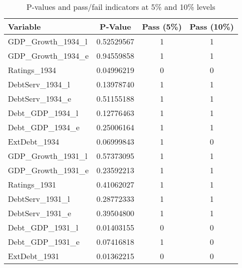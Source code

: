 \begin{table}[ht!]
\centering
\begin{tabular}{lccc}
\toprule
Variable & P‐Value & Pass (5\%) & Pass (10\%) \\
\midrule
GDP\_Growth\_1934\_l   & 0.52529567 & 1 & 1 \\
GDP\_Growth\_1934\_e   & 0.94559858 & 1 & 1 \\
Ratings\_1934          & 0.04996219 & 0 & 0 \\
DebtServ\_1934\_l      & 0.13978740 & 1 & 1 \\
DebtServ\_1934\_e      & 0.51155188 & 1 & 1 \\
Debt\_GDP\_1934\_l     & 0.12776463 & 1 & 1 \\
Debt\_GDP\_1934\_e     & 0.25006164 & 1 & 1 \\
ExtDebt\_1934          & 0.06999843 & 1 & 0 \\
\midrule
GDP\_Growth\_1931\_l   & 0.57373095 & 1 & 1 \\
GDP\_Growth\_1931\_e   & 0.23592213 & 1 & 1 \\
Ratings\_1931          & 0.41062027 & 1 & 1 \\
DebtServ\_1931\_l      & 0.28772333 & 1 & 1 \\
DebtServ\_1931\_e      & 0.39504800 & 1 & 1 \\
Debt\_GDP\_1931\_l     & 0.01403155 & 0 & 0 \\
Debt\_GDP\_1931\_e     & 0.07416818 & 1 & 0 \\
ExtDebt\_1931          & 0.01362215 & 0 & 0 \\
\bottomrule
\end{tabular}
\caption{P-values and pass/fail indicators at 5\% and 10\% levels}
\label{tab:pass_tests}
\end{table}
